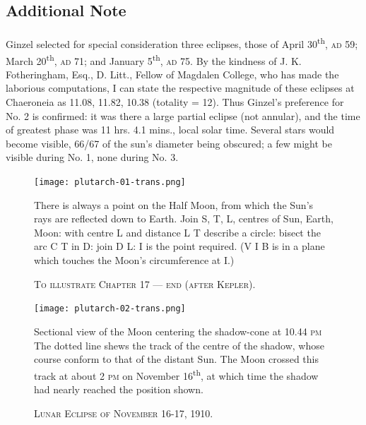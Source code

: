 \documentclass[a4paper, 11pt, oneside, polutonikogreek, english]{article}
\begin{document}
\bigskip
\centerline{\EightStarTaper}
\centerline{\EightStarTaper\EightStarTaper}
\bigskip

\subsection{Additional Note}
\paragraph{}
Ginzel selected for special consideration three eclipses, those of April 30\textsuperscript{th}, \textsc{ad} 59; March 20\textsuperscript{th}, \textsc{ad} 71; and January 5\textsuperscript{th}, \textsc{ad} 75. By the kindness of J. K. Fotheringham, Esq., D. Litt., Fellow of Magdalen College, who has made the laborious computations, I can state the respective magnitude of these eclipses at Chaeroneia as 11.08, 11.82, 10.38 (totality = 12). Thus Ginzel's preference for No. 2 is confirmed: it was there a large partial eclipse (not annular), and the time of greatest phase was 11 hrs. 4.1 mins., local solar time. Several stars would become visible, 66/67 of the sun's diameter being obscured; a few might be visible during No. 1, none during No. 3.
\clearpage
\begin{landscape}
\vspace*{\fill}
\begin{figure}[H]
\centering
\texttt{[image: plutarch-01-trans.png]}
\caption{\textsc{To illustrate Chapter 17 --- end (after Kepler).}}
\footnotesize
There is always a point on the Half Moon, from which the Sun's rays are reflected down to Earth. Join S, T, L, centres of Sun, Earth, Moon: with centre L and distance L T describe a circle: bisect the arc C T in D: join D L: I is the point required. (V I B is in a plane which touches the Moon's circumference at I.)
\end{figure}
\vspace*{\fill}
\clearpage
\vspace*{\fill}
\begin{figure}[H]
\centering
\texttt{[image: plutarch-02-trans.png]}
\caption{\textsc{Lunar Eclipse of November 16-17, 1910.}}
\footnotesize
Sectional view of the Moon centering the shadow-cone at 10.44 \textsc{pm} The dotted line shews the track of the centre of the shadow, whose course conform to that of the distant Sun. The Moon crossed this track at about 2 \textsc{pm} on November 16\textsuperscript{th}, at which time the shadow had nearly reached the position shown.
\end{figure}
\vspace*{\fill}
\end{landscape}
\clearpage
\end{document}
